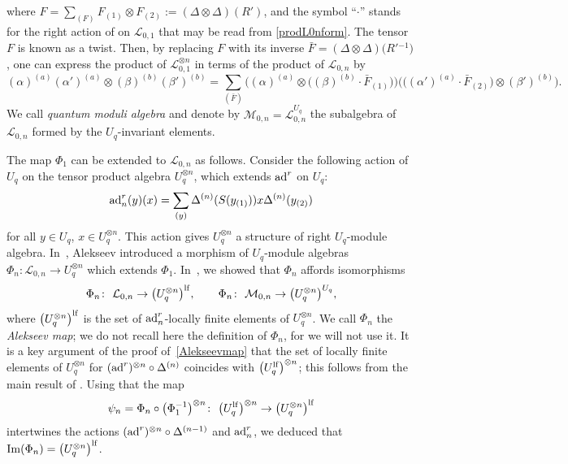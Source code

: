 \documentclass[10pt,a4paper]{amsart}
\numberwithin{equation}{section}
\theoremstyle{definition}
\newcommand{\mUq}{\mathbb{U}_q}
\newcommand{\Ll}{{\mathcal L}}
\newcommand{\Mm}{{\mathcal M}}
\newcommand{\ra}{\rightarrow}
\begin{document}
where $F=\sum_{(F)} F_{(1)}\otimes F_{(2)} := (\Delta \otimes \Delta)(R')$, and the symbol ``$\cdot$'' stands for the right action of \smash{$\mUq^{\hat \otimes 2}$} on $\Ll_{0,1}$ that may be read from \eqref{prodL0nform}. The tensor $F$ is known as a twist. Then, by replacing $F$ with its inverse $\bar{F} = (\Delta \otimes \Delta)\big(R'{}^{-1}\big)$, one can express the product of
$\Ll_{0,1}^{\otimes n}$ in terms of the product of $\Ll_{0,n}$ by
\begin{equation}\label{prodL0nform3}
(\alpha)^{(a)}(\alpha')^{(a)}\otimes (\beta)^{(b)}(\beta')^{(b)} = \sum_{(\bar{F})}\big((\alpha)^{(a)}\otimes
 \big((\beta)^{(b)}\cdot \bar{F}_{(1)}\big)\big) \big( \big((\alpha')^{(a)}\cdot \bar{F}_{(2)}\big)\otimes (\beta')^{(b)}\big).
\end{equation}
 We call {\it quantum moduli algebra} and denote by $\Mm_{0,n} = {\mathcal L}_{0,n}^{U_q}$ the subalgebra of $\Ll_{0,n}$ formed by the $U_q$-invariant elements.


The map $\Phi_1$ can be extended to $\Ll_{0,n}$ as follows. Consider the following action of $U_q$ on the tensor product algebra $U_q^{{\otimes} n}$, which extends ${\rm ad}^r$ on $U_q$:
\[%
{\rm ad}_n^r(y)(x) = \sum_{(y)}\Delta^{(n)}({S}(y_{(1)})) x \Delta^{(n)}(y_{(2)})
\]
for all $y \in U_q$, $x \in U_q^{{\otimes} n}$. This action gives $U_q^{{\otimes} n}$ a structure of right $U_q$-module algebra. In~\cite{A}, Alekseev introduced a morphism of $U_q$-module algebras $\Phi_n\colon \Ll_{0,n} \ra U_q^{\otimes n}$ which extends $\Phi_1$. In~\cite[Proposition~6.7]{BR}, we showed that $\Phi_n$ affords isomorphisms
\begin{equation}\label{Alekseevmap}
\Phi_n\colon\ \Ll_{0,n} \ra \big(U_q^{\otimes n}\big)^{\rm lf},\qquad \Phi_n\colon\ \Mm_{0,n}\rightarrow \big(U_q^{{\otimes} n}\big)^{U_q},
\end{equation}
where $\big(U_q^{\otimes n}\big)^{\rm lf}$ is the set of ${\rm ad}_n^r$-locally finite elements of $U_q^{{\otimes} n}$. We call $\Phi_n$ the {\it Alekseev map}; we do not recall here the definition of $\Phi_n$, for we will not use it. It is a key argument of the proof of~\eqref{Alekseevmap} that the set of locally finite elements of $U_q^{{\otimes} n}$ for $({\rm ad}^r)^{\otimes n}\circ \Delta^{(n)}$ coincides with $\big(U_q^{\rm lf}\big)^{\otimes n}$; this follows from the main result of \cite{KLNY}. Using that the map
\begin{equation}\label{Phipsi}
\psi_n = \Phi_n \circ \big(\Phi_1^{-1}\big)^{\otimes n}\colon\ \big(U_q^{\rm lf}\big)^{\otimes n}\ra \big(U_q^{\otimes n}\big)^{\rm lf}
\end{equation}
intertwines the actions $({\rm ad}^r)^{\otimes n}\circ \Delta^{(n-1)}$ and ${\rm ad}_n^r$, we deduced that ${\rm Im}(\Phi_n) = \big(U_q^{\otimes n}\big)^{\rm lf}$.
\end{document}
